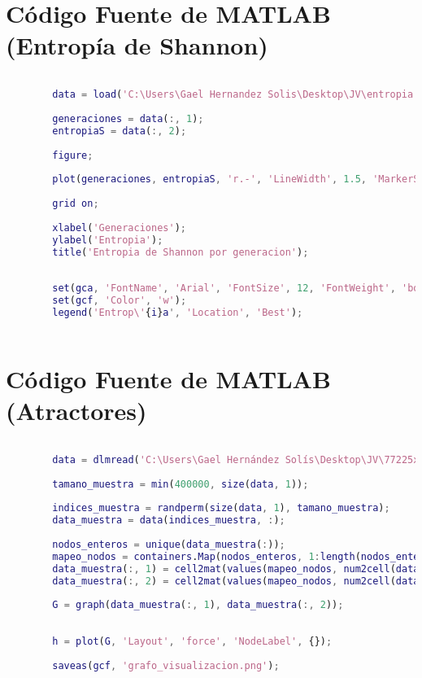 \documentclass{article}
\begin{document}
 	\section{Código Fuente de MATLAB (Entropía de Shannon)}
 	\begin{lstlisting}[language=Matlab, basicstyle=\tiny, breaklines=true, breakatwhitespace=true]
 		
 		data = load('C:\Users\Gael Hernandez Solis\Desktop\JV\entropia.txt');
 		
 		generaciones = data(:, 1);
 		entropiaS = data(:, 2);
 		
 		figure;
 		
 		plot(generaciones, entropiaS, 'r.-', 'LineWidth', 1.5, 'MarkerSize', 10);
 		
 		grid on;
 		
 		xlabel('Generaciones');
 		ylabel('Entropia');
 		title('Entropia de Shannon por generacion');
 		
 		
 		set(gca, 'FontName', 'Arial', 'FontSize', 12, 'FontWeight', 'bold');
 		set(gcf, 'Color', 'w');
 		legend('Entrop\'{i}a', 'Location', 'Best');
 		
 	\end{lstlisting}	
 	
 	\section{Código Fuente de MATLAB (Atractores)}
 	\begin{lstlisting}[language=Matlab, basicstyle=\tiny, breaklines=true, breakatwhitespace=true]
 		
 		data = dlmread('C:\Users\Gael Hernández Solís\Desktop\JV\77225x5.txt');
 		
 		tamano_muestra = min(400000, size(data, 1)); 
 		
 		indices_muestra = randperm(size(data, 1), tamano_muestra);
 		data_muestra = data(indices_muestra, :);
 		
 		nodos_enteros = unique(data_muestra(:));
 		mapeo_nodos = containers.Map(nodos_enteros, 1:length(nodos_enteros));
 		data_muestra(:, 1) = cell2mat(values(mapeo_nodos, num2cell(data_muestra(:, 1))));
 		data_muestra(:, 2) = cell2mat(values(mapeo_nodos, num2cell(data_muestra(:, 2))));
 		
 		G = graph(data_muestra(:, 1), data_muestra(:, 2));
 		
 		
 		h = plot(G, 'Layout', 'force', 'NodeLabel', {});
 		
 		saveas(gcf, 'grafo_visualizacion.png');
 	
 	\end{lstlisting}
 	
\end{document}
